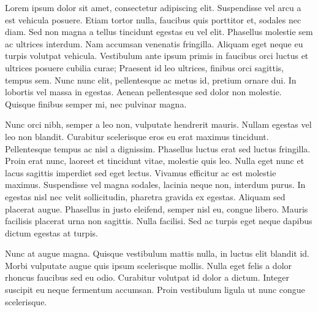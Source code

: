 \label{ch:introduction}
 Lorem ipsum dolor sit amet, consectetur adipiscing elit. Suspendisse vel arcu a est vehicula posuere. Etiam tortor nulla, faucibus quis porttitor et, sodales nec diam. Sed non magna a tellus tincidunt egestas eu vel elit. Phasellus molestie sem ac ultrices interdum. Nam accumsan venenatis fringilla. Aliquam eget neque eu turpis volutpat vehicula. Vestibulum ante ipsum primis in faucibus orci luctus et ultrices posuere cubilia curae; Praesent id leo ultrices, finibus orci sagittis, tempus sem. Nunc nunc elit, pellentesque ac metus id, pretium ornare dui. In lobortis vel massa in egestas. Aenean pellentesque sed dolor non molestie. Quisque finibus semper mi, nec pulvinar magna.

Nunc orci nibh, semper a leo non, vulputate hendrerit mauris. Nullam egestas vel leo non blandit. Curabitur scelerisque eros eu erat maximus tincidunt. Pellentesque tempus ac nisl a dignissim. Phasellus luctus erat sed luctus fringilla. Proin erat nunc, laoreet et tincidunt vitae, molestie quis leo. Nulla eget nunc et lacus sagittis imperdiet sed eget lectus. Vivamus efficitur ac est molestie maximus. Suspendisse vel magna sodales, lacinia neque non, interdum purus. In egestas nisl nec velit sollicitudin, pharetra gravida ex egestas. Aliquam sed placerat augue. Phasellus in justo eleifend, semper nisl eu, congue libero. Mauris facilisis placerat urna non sagittis. Nulla facilisi. Sed ac turpis eget neque dapibus dictum egestas at turpis.

Nunc at augue magna. Quisque vestibulum mattis nulla, in luctus elit blandit id. Morbi vulputate augue quis ipsum scelerisque mollis. Nulla eget felis a dolor rhoncus faucibus sed eu odio. Curabitur volutpat id dolor a dictum. Integer suscipit eu neque fermentum accumsan. Proin vestibulum ligula ut nunc congue scelerisque. 
